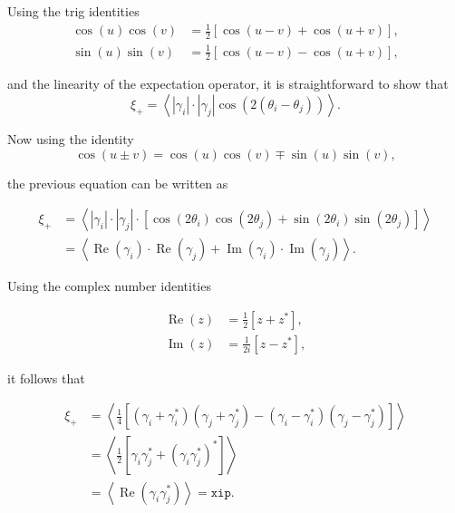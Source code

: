 \documentclass[%
 reprint,
 amsmath,amssymb,
 aps,
]{revtex4-1}
\begin{document}
Using the trig identities
\begin{align}
\cos(u)\cos(v)&=\frac{1}{2}\left[\cos(u-v)+\cos(u+v)\right],\\
\sin(u)\sin(v)&=\frac{1}{2}\left[\cos(u-v)-\cos(u+v)\right],
\end{align}

and the linearity of the expectation operator, it is straightforward to show that
$$\xi_+=\left<|\gamma_i|\cdot|\gamma_j|\cos\left(2(\theta_i-\theta_j)\right)\right>.$$

Now using the identity
\begin{equation}\label{trig2}
\cos(u\pm v)=\cos\left(u\right)\cos\left(v\right)\mp\sin\left(u\right)\sin\left(v\right),
\end{equation}

the previous equation can be written as

\begin{align*}
\xi_+&=\left<|\gamma_i|\cdot|\gamma_j|\cdot\left[\cos\left(2\theta_i\right)\cos\left(2\theta_j\right)+\sin\left(2\theta_i\right)\sin\left(2\theta_j\right)\right]\right>\\
&=\left<\operatorname{Re}(\gamma_i)\cdot\operatorname{Re}(\gamma_j)+\operatorname{Im}(\gamma_i)\cdot\operatorname{Im}(\gamma_j)\right>.
\end{align*}

Using the complex number identities

\begin{align}
\operatorname{Re}(z)&=\frac{1}{2}\left[z+z^*\right],\label{complex1}\\
\operatorname{Im}(z)&=\frac{1}{2i}\left[z-z^*\right]\label{complex2},
\end{align}

it follows that

\begin{align*}
\xi_+&=\left<\frac{1}{4}\left[(\gamma_i+\gamma_i^*)(\gamma_j+\gamma_j^*)-(\gamma_i-\gamma_i^*)(\gamma_j-\gamma_j^*)\right]\right>\\
&=\left<\frac{1}{2}\left[\gamma_i\gamma_j^*+(\gamma_i\gamma_j^*)^*\right]\right>\\
&=\left<\operatorname{Re}(\gamma_i\gamma_j^*)\right>=\texttt{xip}.
\end{align*}
\end{document}
